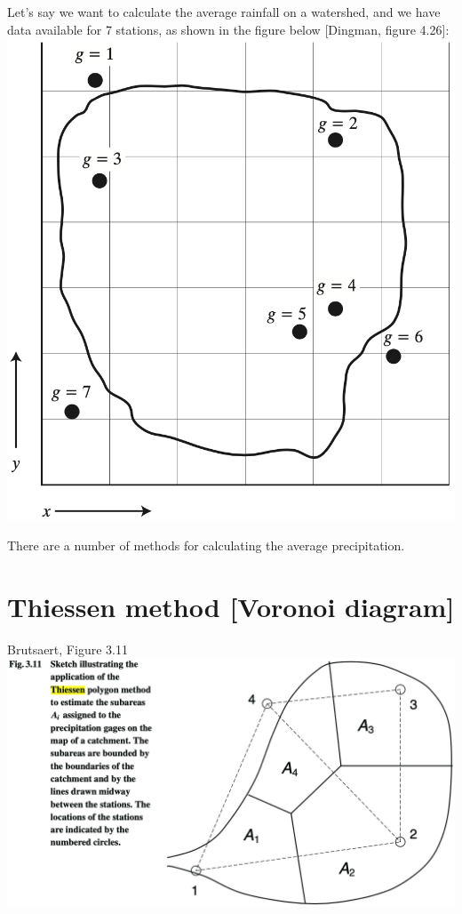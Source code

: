 \documentclass[
  letterpaper,
  DIV=11,
  numbers=noendperiod]{scrreprt}
\begin{document}
Let's say we want to calculate the average rainfall on a watershed, and
we have data available for 7 stations, as shown in the figure below
{[}Dingman, figure 4.26{]}:
\includegraphics{archive/figures/dingman-figure4.26.png}

There are a number of methods for calculating the average precipitation.

\hypertarget{thiessen-method-voronoi-diagram}{%
\section{Thiessen method {[}Voronoi
diagram{]}}\label{thiessen-method-voronoi-diagram}}

Brutsaert, Figure 3.11
\includegraphics{archive/figures/brutsaert-figure3.11.png}
\end{document}
